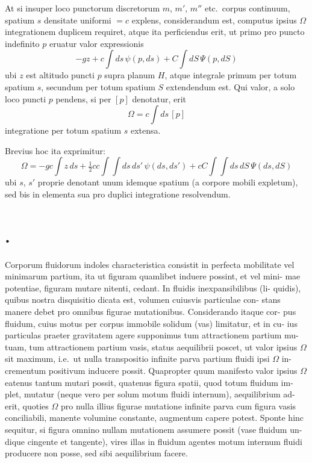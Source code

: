 \documentclass[12pt,a4paper]{article}
\theoremstyle{gauss}
\begin{document}
At si insuper loco punctorum discretorum $m$, $m'$, $m''$ etc.~corpus continuum,
spatium $s$ densitate uniformi $=c$ explens, considerandum est, computus ipsius
$\Omega$ integrationem duplicem requiret, atque ita perficiendus erit, ut primo pro
puncto indefinito $p$ eruatur valor expressionis
\[
-gz + c\int ds\,\psi(p,ds) + C\int dS\,\Psi(p,dS)
\]
ubi $z$ est altitudo puncti $p$ supra planum $H$, atque integrale primum per totum
spatium $s$, secundum per totum spatium $S$ extendendum est. Qui valor, a solo
loco puncti $p$ pendens, si per $[p]$ denotatur, erit
\[
\Omega = c\int ds\,[p]
\]
integratione per totum spatium $s$ extensa.

Brevius hoc ita exprimitur:
\[
\Omega = -gc\int z\,ds + \tfrac{1}{2}cc\int\!\!\int ds\,ds'\,\psi(ds,ds') + cC\int\!\!\int ds\,dS\,\Psi(ds,dS)
\]
ubi $s$, $s'$ proprie denotant unum idemque spatium (a corpore mobili expletum),
sed bis in elementa sua pro duplici integratione resolvendum.

\section*{%
%
\thesection.}

Corporum fluidorum indoles characteristica consistit in perfecta mobilitate
vel minimarum partium, ita ut figuram quamlibet induere possint, et vel mini-
mae potentiae, figuram mutare nitenti, cedant. In fluidis inexpansibilibus (li-
quidis), quibus nostra disquisitio dicata est, volumen cuiusvis particulae con-
stans manere debet pro omnibus figurae mutationibus. Considerando itaque cor-
pus fluidum, cuius motus per corpus immobile solidum (vas) limitatur, et in cu-
ius particulas praeter gravitatem agere supponimus tum attractionem partium mu-
tuam, tum attractionem partium vasis, status aequilibrii poscet, ut valor ipsius
$\Omega$ sit maximum, i.e.~ut nulla transpositio infinite parva partium fluidi ipsi $\Omega$ in-
crementum positivum inducere possit. Quapropter quum manifesto valor ipsius
$\Omega$ eatenus tantum mutari possit, quatenus figura spatii, quod totum fluidum im-
plet, mutatur (neque vero per solum motum fluidi internum), aequilibrium ad-
erit, quoties $\Omega$ pro nulla illius figurae mutatione infinite parva cum figura vasis
conciliabili, manente volumine constante, augmentum capere potest. Sponte hinc
sequitur, si figura omnino nullam mutationem assumere possit (vase fluidum un-
dique cingente et tangente), vires illas in fluidum agentes motum internum fluidi
producere non posse, sed sibi aequilibrium facere.
\end{document}
